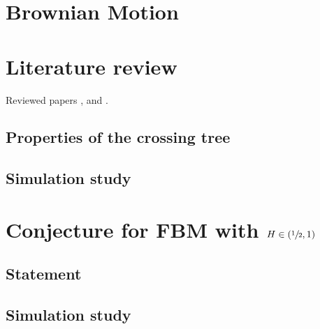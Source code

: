 \documentclass[a4paper]{report}
\begin{document}



\section{Brownian Motion} %
\label{sec:brownian_motion}

\section{Literature review} %
\label{sec:literature_review}
Reviewed papers \cite{jones2004}, \cite{jonesshen2005} and \cite{decrouez2013}.


\subsection{Properties of the crossing tree} %
\label{sub:properties_of_the_crossing_tree}


\subsection{Simulation study} %
\label{sub:simulation_study_bm}



\section{Conjecture for FBM with $H\in (\sfrac{1}{2},1)$} %
\label{sec:conjecture_for_fbm}

\subsection{Statement} %
\label{sub:statement}


\subsection{Simulation study} %
\label{sub:simulation_study_fbm}
\end{document}
